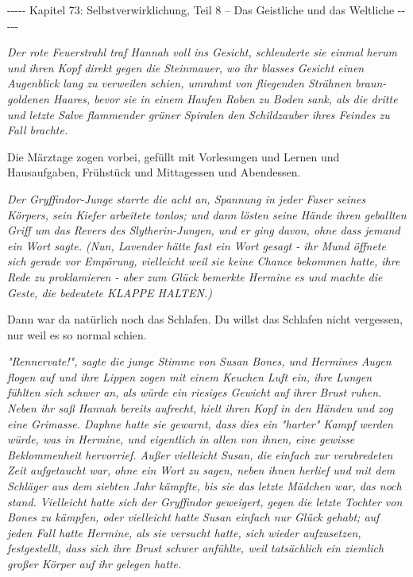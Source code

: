 

\hypertarget{selbstverwirklichung-teil-8-das-geistliche-und-das-weltliche}{%

-\/-\/-\/-\/- Kapitel 73: Selbstverwirklichung, Teil 8 -- Das Geistliche und das Weltliche -\/-\/-\/-\/-

\emph{Der rote Feuerstrahl traf Hannah voll ins Gesicht, schleuderte sie einmal herum und ihren Kopf direkt gegen die Steinmauer, wo ihr blasses Gesicht einen Augenblick lang zu verweilen schien, umrahmt von fliegenden Strähnen braun-goldenen Haares, bevor sie in einem Haufen Roben zu Boden sank, als die dritte und letzte Salve flammender grüner Spiralen den Schildzauber ihres Feindes zu Fall brachte.}

Die Märztage zogen vorbei, gefüllt mit Vorlesungen und Lernen und Hausaufgaben, Frühstück und Mittagessen und Abendessen.

\emph{Der Gryffindor-Junge starrte die acht an, Spannung in jeder Faser seines Körpers, sein Kiefer arbeitete tonlos; und dann lösten seine Hände ihren geballten Griff um das Revers des Slytherin-Jungen, und er ging davon, ohne dass jemand ein Wort sagte. (Nun, Lavender hätte fast ein Wort gesagt - ihr Mund öffnete sich gerade vor Empörung, vielleicht weil sie keine Chance bekommen hatte, ihre Rede zu proklamieren - aber zum Glück bemerkte Hermine es und machte die Geste, die bedeutete KLAPPE HALTEN.)}

Dann war da natürlich noch das Schlafen. Du willst das Schlafen nicht vergessen, nur weil es so normal schien.

\emph{"Rennervate!", sagte die junge Stimme von Susan Bones, und Hermines Augen flogen auf und ihre Lippen zogen mit einem Keuchen Luft ein, ihre Lungen fühlten sich schwer an, als würde ein riesiges Gewicht auf ihrer Brust ruhen. Neben ihr saß Hannah bereits aufrecht, hielt ihren Kopf in den Händen und zog eine Grimasse. Daphne hatte sie gewarnt, dass dies ein "harter" Kampf werden würde, was in Hermine, und eigentlich in allen von ihnen, eine gewisse Beklommenheit hervorrief. Außer vielleicht Susan, die einfach zur verabredeten Zeit aufgetaucht war, ohne ein Wort zu sagen, neben ihnen herlief und mit dem Schläger aus dem siebten Jahr kämpfte, bis sie das letzte Mädchen war, das noch stand. Vielleicht hatte sich der Gryffindor geweigert, gegen die letzte Tochter von Bones zu kämpfen, oder vielleicht hatte Susan einfach nur Glück gehabt; auf jeden Fall hatte Hermine, als sie versucht hatte, sich wieder aufzusetzen, festgestellt, dass sich ihre Brust schwer anfühlte, weil tatsächlich ein ziemlich großer Körper auf ihr gelegen hatte.}

}
